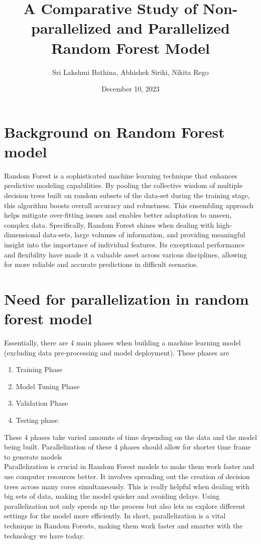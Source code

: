 \documentclass{article}
\title{\textbf {A Comparative Study of Non-parallelized and  Parallelized Random Forest Model}}
\author{Sri Lakshmi Bathina, Abhishek Siriki, Nikita Rego }
\date{December 10, 2023}
\begin{document}
\maketitle
\section{Background on Random Forest model}
Random Forest is a sophisticated machine learning technique that enhances predictive modeling capabilities. By pooling the collective wisdom of multiple decision trees built on random subsets of the data-set during the training stage, this algorithm boosts overall accuracy and robustness. This ensembling approach helps mitigate over-fitting issues and enables better adaptation to unseen, complex data. Specifically, Random Forest shines when dealing with high-dimensional data-sets, large volumes of information, and providing meaningful insight into the importance of individual features. Its exceptional performance and flexibility have made it a valuable asset across various disciplines, allowing for more reliable and accurate predictions in difficult scenarios.

\section{Need for parallelization in random forest model}
Essentially, there are 4 main phases when building a machine learning model (excluding data pre-processing and model deployment). These phases are 
\begin{enumerate}
    \item Training Phase
    \item Model Tuning Phase
    \item Validation Phase
    \item Testing phase. 
\end{enumerate}
These 4 phases take varied amounts of time depending on the data and the model being built. Parallelization of these 4 phases should allow for shorter time frame to generate models \\ 

Parallelization is crucial in Random Forest models to make them work faster and use computer resources better. It involves spreading out the creation of decision trees across many cores simultaneously. This is really helpful when dealing with big sets of data, making the model quicker and avoiding delays. Using parallelization not only speeds up the process but also lets us explore different settings for the model more efficiently. In short, parallelization is a vital technique in Random Forests, making them work faster and smarter with the technology we have today.
\end{document}
